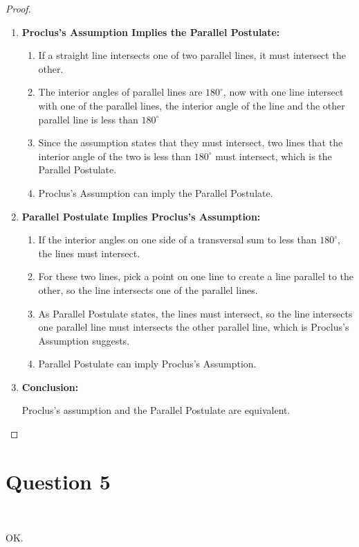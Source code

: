 \documentclass{article}
\begin{document}
\begin{proof}

~

\begin{enumerate}
    \item \textbf{Proclus's Assumption Implies the Parallel Postulate:}
   \begin{enumerate}
        \item If a straight line intersects one of two parallel lines, it must intersect the other.
        \item The interior angles of parallel lines are \(180^\circ\), now with one line intersect with one of the parallel lines, the interior angle of the line and the other parallel line is less than \(180^\circ\)
        \item Since the assumption states that they must intersect, two lines that the interior angle of the two is less than \(180^\circ\) must intersect, which is the Parallel Postulate.
        
        \item Proclus's Assumption can imply the Parallel Postulate.
   \end{enumerate}

    \item \textbf{Parallel Postulate Implies Proclus's Assumption:}
   \begin{enumerate}
        \item If the interior angles on one side of a transversal sum to less than \( 180^\circ \), the lines must intersect.
        \item For these two lines, pick a point on one line to create a line parallel to the other, so the line intersects one of the parallel lines.
        \item As Parallel Postulate states, the lines must intersect, so the line intersects one parallel line must intersects the other parallel line, which is Proclus's Assumption suggests.
        \item Parallel Postulate can imply Proclus's Assumption.
   \end{enumerate}

    \item \textbf{Conclusion:}
    
    Proclus's assumption and the Parallel Postulate are equivalent.
\end{enumerate}
\end{proof}

\newpage

\section*{Question 5}

~

OK.
\end{document}
